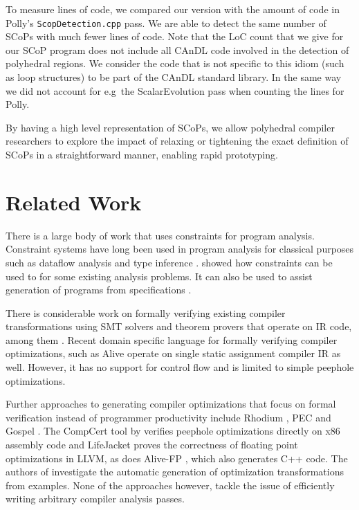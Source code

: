     To measure lines of code, we compared our version with the amount of code in
    Polly's \texttt{ScopDetection.cpp} pass.
    We are able to detect the same number of SCoPs with much fewer lines of
    code.
    Note that the LoC count that we give for our SCoP program does not include
    all CAnDL code involved in the detection of polyhedral regions.
    We consider the code that is not specific to this idiom (such as loop
    structures) to be part of the CAnDL standard library.
    In the same way we did not account for e.g\ the ScalarEvolution pass when
    counting the lines for Polly.

    By having a high level representation of SCoPs, we allow polyhedral compiler
    researchers to explore the impact of relaxing or tightening the exact
    definition of SCoPs in a straightforward manner, enabling rapid prototyping.


\begin{figure}[ht]
    
    \label{fig:candlvspolly}
\end{figure}

\section{Related Work}

    There is a large body of work that uses constraints for program analysis.
    Constraint systems have long been used in program analysis for classical
    purposes such as dataflow analysis and type inference
    \citep{Aiken:1999:ISC:339853.339897}.
    \citet{Gulwani:2008:PAC:1375581.1375616} showed how constraints can be
    used to for some  existing analysis problems.
    It can also be used to assist generation of programs from specifications
    \citep{Srivastava:2010:PVP:1707801.1706337}.

    There is considerable work on formally verifying existing compiler
    transformations using SMT solvers and theorem provers that operate on IR
    code, among them \cite{Zhao:2012:FLI:2103656.2103709}.
    Recent domain specific language for formally verifying compiler
    optimizations, such as Alive \cite{Lopes:2015:PCP:2737924.2737965} operate
    on single static assignment compiler IR as well.
    However, it has no support for control flow and is limited to simple
    peephole optimizations.

    Further approaches to generating compiler optimizations that focus on formal
    verification instead of programmer productivity include Rhodium
    \citep{Lerner:2005:ASP:1040305.1040335}, PEC
    \citep{Kundu:2009:POC:1543135.1542513} and Gospel
    \citep{Whitfield:1997:AEC:267959.267960}.
    The CompCert tool by \citet{Mullen:2016:VPO:2908080.2908109} verifies peephole
    optimizations directly on x86 assembly code and LifeJacket
    \cite{Notzli:2016:LVP:2931021.2931024} proves the correctness of floating
    point optimizations in LLVM, as does Alive-FP \cite{Menendez2016}, which
    also generates C++ code.
    The authors of \cite{Tate:2010:GCO:1706299.1706345} investigate the
    automatic generation of optimization transformations from examples.
    None of the approaches however, tackle the issue of efficiently writing
    arbitrary compiler analysis passes.

